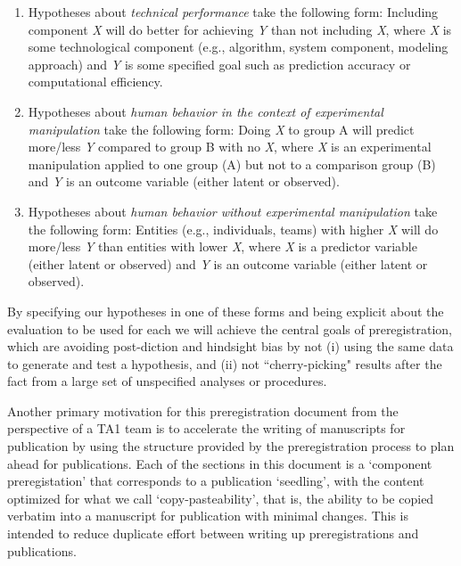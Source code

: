 \begin{enumerate}

    \item Hypotheses about \emph{technical performance} take the following form:
        Including component \emph{X} will do better for achieving \emph{Y} than
        not including \emph{X}, where \emph{X} is some technological component
        (e.g., algorithm, system component, modeling approach) and \emph{Y} is
        some specified goal such as prediction accuracy or computational
        efficiency.

    \item Hypotheses about \emph{human behavior in the context of experimental
        manipulation} take the following form: Doing \emph{X} to group A will
        predict more/less \emph{Y} compared to group B with no \emph{X}, where
        \emph{X} is an experimental manipulation applied to one group (A) but
        not to a comparison group (B) and \emph{Y} is an outcome variable
        (either latent or observed).

    \item Hypotheses about \emph{human behavior without experimental manipulation}
        take the following form: Entities (e.g., individuals, teams) with
        higher \emph{X} will do more/less \emph{Y} than entities with lower
        \emph{X}, where \emph{X} is a predictor variable (either latent or
        observed) and \emph{Y} is an outcome variable (either latent or
        observed).

\end{enumerate}

By specifying our hypotheses in one of these forms and being explicit about the
evaluation to be used for each we will achieve the central goals of
preregistration, which are avoiding post-diction and hindsight bias by not (i)
using the same data to generate and test a hypothesis, and (ii) not
``cherry-picking" results after the fact from a large set of unspecified
analyses or procedures.

Another primary motivation for this preregistration document from the
perspective of a TA1 team is to accelerate the writing of manuscripts for
publication by using the structure provided by the preregistration process to
plan ahead for publications. Each of the sections in this document is a
`component preregistation' that corresponds to a publication ‘seedling’, with
the content optimized for what we call `copy-pasteability', that is, the
ability to be copied verbatim into a manuscript for publication with minimal
changes. This is intended to reduce duplicate effort between writing up
preregistrations and publications.

